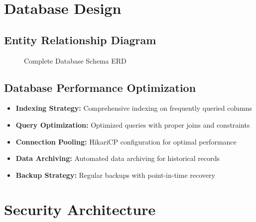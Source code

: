 \documentclass[12pt,a4paper]{article}
\begin{document}
\section{Database Design}

\subsection{Entity Relationship Diagram}

\begin{figure}[H]
\centering
{}
\caption{Complete Database Schema ERD}
\label{fig:complete-database-schema}
\end{figure}

\subsection{Database Performance Optimization}
\begin{itemize}
    \item \textbf{Indexing Strategy:} Comprehensive indexing on frequently queried columns
    \item \textbf{Query Optimization:} Optimized queries with proper joins and constraints
    \item \textbf{Connection Pooling:} HikariCP configuration for optimal performance
    \item \textbf{Data Archiving:} Automated data archiving for historical records
    \item \textbf{Backup Strategy:} Regular backups with point-in-time recovery
\end{itemize}

\section{Security Architecture}
\end{document}
